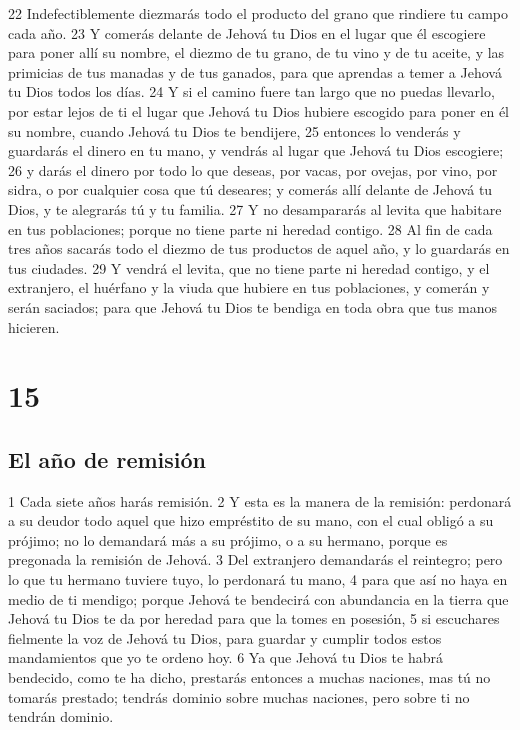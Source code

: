 22 Indefectiblemente diezmarás  todo el producto del grano que rindiere tu campo cada año.
23 Y comerás delante de Jehová tu Dios en el lugar que él escogiere para poner allí su nombre, el diezmo de tu grano, de tu vino y de tu aceite, y las primicias de tus manadas y de tus ganados, para que aprendas a temer a Jehová tu Dios todos los días.
24 Y si el camino fuere tan largo que no puedas llevarlo, por estar lejos de ti el lugar que Jehová tu Dios hubiere escogido para poner en él su nombre, cuando Jehová tu Dios te bendijere,
25 entonces lo venderás y guardarás el dinero en tu mano, y vendrás al lugar que Jehová tu Dios escogiere;
26 y darás el dinero por todo lo que deseas, por vacas, por ovejas, por vino, por sidra, o por cualquier cosa que tú deseares; y comerás allí delante de Jehová tu Dios, y te alegrarás tú y tu familia.
27 Y no desampararás al levita que habitare en tus poblaciones; porque no tiene parte ni heredad contigo.
28 Al fin de cada tres años sacarás todo el diezmo de tus productos de aquel año, y lo guardarás en tus ciudades.
29 Y vendrá el levita, que no tiene parte ni heredad contigo, y el extranjero, el huérfano y la viuda que hubiere en tus poblaciones, y comerán y serán saciados; para que Jehová tu Dios te bendiga en toda obra que tus manos hicieren.

\chapter{15}

\section{El año de remisión}

1 Cada siete años harás remisión.
2 Y esta es la manera de la remisión: perdonará a su deudor todo aquel que hizo empréstito de su mano, con el cual obligó a su prójimo; no lo demandará más a su prójimo, o a su hermano, porque es pregonada la remisión de Jehová.
3 Del extranjero demandarás el reintegro; pero lo que tu hermano tuviere tuyo, lo perdonará tu mano,
4 para que así no haya en medio de ti mendigo; porque Jehová te bendecirá con abundancia en la tierra que Jehová tu Dios te da por heredad para que la tomes en posesión,
5 si escuchares fielmente la voz de Jehová tu Dios, para guardar y cumplir todos estos mandamientos que yo te ordeno hoy.
6 Ya que Jehová tu Dios te habrá bendecido, como te ha dicho, prestarás entonces a muchas naciones, mas tú no tomarás prestado; tendrás dominio sobre muchas naciones, pero sobre ti no tendrán dominio. 

